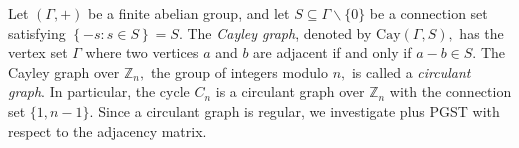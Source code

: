 \documentclass[12pt,a4paper]{article}
\def \e {{\bf e}}
\def \x {{\bf x}}
\def \e {{\mathbf e}}
\newcommand{\ob}[1]{\left(#1\right)}
\newcommand{\tb}[1]{\left[#1\right]}
\begin{document}
Let $(\Gamma,+)$ be a finite abelian group, and let $S \subseteq\Gamma\backslash\{0\}$ be a connection set satisfying $\left\lbrace -s:s\in S\right\rbrace=S.$ The \emph{Cayley graph}, denoted by $\text{Cay}(\Gamma, S),$ has the vertex set $\Gamma$ where two vertices $a$ and $b$ are adjacent if and only if $a-b\in S$. The Cayley graph over $\mathbb{Z}_n,$ the group of integers modulo $n,$ is called a \emph{circulant graph}. In particular, the cycle $C_n$ is a circulant graph over $\mathbb{Z}_n$ with the connection set $\{1,n-1\}.$
Since a circulant graph is regular,
we investigate plus PGST with respect to the adjacency matrix.
\end{document}
